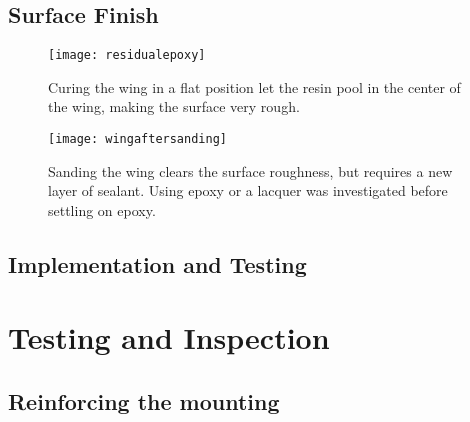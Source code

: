 
  \subsection{Surface Finish}

    \begin{figure}
      \texttt{[image: residualepoxy]}
      \caption{Curing the wing in a flat position let the resin pool in the center of the wing, making the surface very rough.}
      \label{fig:roughsurface}
    \end{figure}

    \begin{figure}
      \texttt{[image: wingaftersanding]}
      \caption{Sanding the wing clears the surface roughness, but requires a new layer of sealant. Using epoxy or a lacquer was investigated before settling on epoxy.}
      \label{fig:wingaftersanding}
    \end{figure}

  \subsection{Implementation and Testing}

\section{Testing and Inspection}

  \subsection{Reinforcing the mounting}

